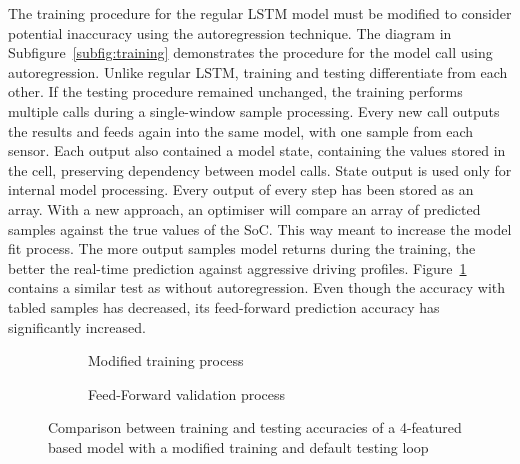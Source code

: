 %
%
The training procedure for the regular LSTM model must be modified to consider potential inaccuracy using the autoregression technique.
The diagram in Subfigure~\ref{subfig:training} demonstrates the procedure for the model call using autoregression.
Unlike regular LSTM, training and testing differentiate from each other.
If the testing procedure remained unchanged, the training performs multiple calls during a single-window sample processing.
Every new call outputs the results and feeds again into the same model, with one sample from each sensor.
Each output also contained a model state, containing the values stored in the cell, preserving dependency between model calls.
State output is used only for internal model processing.
Every output of every step has been stored as an array.
With a new approach, an optimiser will compare an array of predicted samples against the true values of the SoC.
This way meant to increase the model fit process.
The more output samples model returns during the training, the better the real-time prediction against aggressive driving profiles.
Figure~\ref{fig:modefied_tr} contains a similar test as without autoregression.
Even though the accuracy with tabled samples has decreased, its feed-forward prediction accuracy has significantly increased.
\begin{figure}[htbp]
    \centering
    \begin{subfigure}[b]{0.45\textwidth}
        \centering
        
        \caption{Modified training process}
    \end{subfigure}
    \begin{subfigure}[b]{0.45\textwidth}
        \centering
        
        \caption{Feed-Forward validation process}
    \end{subfigure}
    \caption{Comparison between training and testing accuracies of a 4-featured based model with a modified training and default testing loop}
    \label{fig:modefied_tr}
\end{figure}
